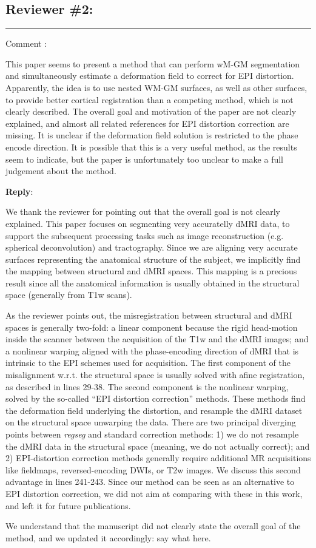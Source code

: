\documentclass[9pt]{memoir}
\newcounter{reviewpoint}
\newenvironment{reviewpoint}%
{\refstepcounter{reviewpoint}\par\medskip\vspace{3ex}\hrule\vspace{1.5ex}\par\noindent%
   {\fontseries{b}\selectfont Comment \arabic{reviewpoint}:}
   \begingroup%
   \color{black!60}
   \fontshape{it}\selectfont %

}
{\endgroup\label{com:\thereviewpoint}\par\medskip}
\newcommand{\reply}{\par\fontshape{n}\selectfont \noindent \textbf{Reply}:\ }
\begin{document}
\subsection*{Reviewer \#2:}
\begin{reviewpoint}
This paper seems to present a method that can perform wM-GM segmentation and simultaneously estimate a deformation field to
  correct for EPI distortion.
Apparently, the idea is to use nested WM-GM surfaces, as well as other surfaces, to provide better cortical registration than
  a competing method, which is not clearly described.
The overall goal and motivation of the paper are not clearly explained, and almost all related references for EPI distortion
  correction are missing.
It is unclear if the deformation field solution is restricted to the phase encode direction.
It is possible that this is a very useful method, as the results seem to indicate, but the paper is unfortunately too unclear to
  make a full judgement about the method.
\end{reviewpoint}
\reply{
We thank the reviewer for pointing out that the overall goal is not clearly explained.
This paper focuses on segmenting very accuratelly dMRI data, to support the subsequent processing tasks
  such as image reconstruction (e.g. spherical deconvolution) and tractography.
Since we are aligning very accurate surfaces representing the anatomical structure of the subject, we
  implicitly find the mapping between structural and dMRI spaces.
This mapping is a precious result since all the anatomical information is usually obtained in the structural
  space (generally from T1w scans).

As the reviewer points out, the misregistration between structural and dMRI spaces is generally two-fold:
  a linear component because the rigid head-motion inside the scanner between the acquisition of the
  T1w and the dMRI images; and a nonlinear warping aligned with the phase-encoding direction of dMRI
  that is intrinsic to the EPI schemes used for acquisition.
The first component of the misalignment w.r.t. the structural space is usually solved with afine registration, as
  described in lines 29-38.
The second component is the nonlinear warping, solved by the so-called ``EPI distortion correction'' methods.
These methods find the deformation field underlying the distortion, and resample the dMRI dataset on the structural space
  unwarping the data.
There are two principal diverging points between \emph{regseg} and standard correction methods:
  1) we do not resample the dMRI data in the structural space (meaning, we do not actually correct);
  and 2) EPI-distortion correction methods generally require additional MR acquisitions like fieldmaps, reversed-encoding
  DWIs, or T2w images.
We discuss this second advantage in lines 241-243.
Since our method can be seen as an alternative to EPI distortion correction, we did not aim at comparing with
  these in this work, and left it for future publications.

We understand that the manuscript did not clearly state the overall goal of the method, and we updated it accordingly: 
 {\color{red} say what here}.
}
\end{document}
